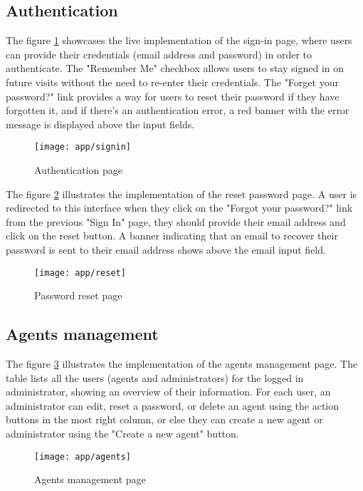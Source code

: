 \subsection{Authentication}
The figure \ref{ss-signin} showcases the live implementation of the sign-in page, where users can provide
their credentials (email address and password) in order to authenticate. The "Remember Me" checkbox allows
users to stay signed in on future visits without the need to re-enter their credentials. The "Forget your
password?" link provides a way for users to reset their password if they have forgotten it, and if there's
an authentication error, a red banner with the error message is displayed above the input fields. \\

\begin{figure}[hbt!]
    \centering
    \texttt{[image: app/signin]}
    \caption{Authentication page}
    \label{ss-signin}
\end{figure}

The figure \ref{ss-reset} illustrates the implementation of the reset password page. A user is redirected to
this interface when they click on the "Forgot your password?" link from the previous "Sign In" page,
they should provide their email address and click on the reset button. A banner indicating that an email
to recover their password is sent to their email address shows above the email input field.
\begin{figure}[hbt!]
    \centering
    \texttt{[image: app/reset]}
    \caption{Password reset page}
    \label{ss-reset}
\end{figure}

\subsection{Agents management}
The figure \ref{ss-agents} illustrates the implementation of the agents management page.
The table lists all the users (agents and administrators) for the logged in administrator, showing
an overview of their information. For each user, an administrator can edit, reset a password, or delete
an agent using the action buttons in the most right column, or else they can create a new
agent or administrator using the "Create a new agent" button.

\begin{figure}[hbt!]
    \centering
    \texttt{[image: app/agents]}
    \caption{Agents management page}
    \label{ss-agents}
\end{figure}


